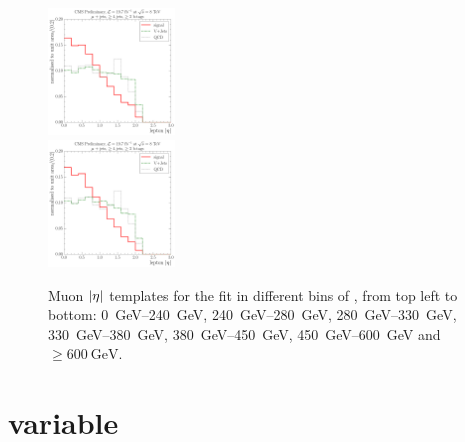 \begin{figure}[!htbp]
  	{\includegraphics[width=0.3\textwidth]{measurement/HT/central/fit_templates/muon_templates_bin_450-600}}\\
  	{\includegraphics[width=0.3\textwidth]{measurement/HT/central/fit_templates/muon_templates_bin_600-inf}}
    \caption[Muon $\abs \eta$ templates for the fit in different bins of \HT]{Muon $\abs \eta$ templates for the fit in
    different bins of \HT, from top left to bottom: \SIrange{0}{240}{\GeV}, \SIrange{240}{280}{\GeV},
    \SIrange{280}{330}{\GeV}, \SIrange{330}{380}{\GeV}, \SIrange{380}{450}{\GeV}, \SIrange{450}{600}{\GeV} and $\geq
    \SI{600}{\GeV}$.}
    \label{fig:fit_templates_HT_muon}
\end{figure}

\newpage
\section*{\ST variable}

